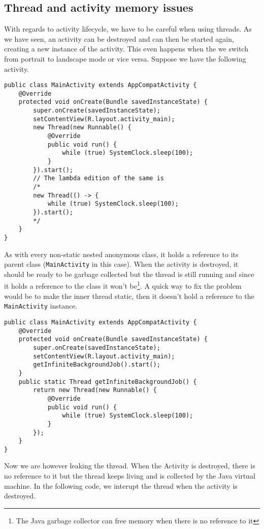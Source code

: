 \subsection{Thread and activity memory issues}
With regards to activity lifecycle, we have to be careful when using threads. As we have seen, an activity can be destroyed and can then be started again, creating a new instance of the activity. This even happens when the we switch from portrait to landscape mode or vice versa. Suppose we have the following activity.
\begin{lstlisting}[style=A_Java]
public class MainActivity extends AppCompatActivity {
    @Override
    protected void onCreate(Bundle savedInstanceState) {
        super.onCreate(savedInstanceState);
        setContentView(R.layout.activity_main);
        new Thread(new Runnable() {
            @Override
            public void run() {
                while (true) SystemClock.sleep(100);
            }
        }).start();
        // The lambda edition of the same is
        /*
        new Thread(() -> {
            while (true) SystemClock.sleep(100);
        }).start();
        */
    }
}
\end{lstlisting}
As with every non-static nested anonymous class, it holds a reference to its parent class (\texttt{MainActivity} in this case). When the activity is destroyed, it should be ready to be garbage collected but the thread is still running and since it holds a reference to the class it won't be\footnote{The Java garbage collector can free memory when there is no reference to it}. A quick way to fix the problem would be to make the inner thread static, then it doesn't hold a reference to the \texttt{MainActivity} instance.
\begin{lstlisting}[style=A_Java]
public class MainActivity extends AppCompatActivity {
    @Override
    protected void onCreate(Bundle savedInstanceState) {
        super.onCreate(savedInstanceState);
        setContentView(R.layout.activity_main);
        getInfiniteBackgroundJob().start();
    }
    public static Thread getInfiniteBackgroundJob() {
        return new Thread(new Runnable() {
            @Override
            public void run() {
                while (true) SystemClock.sleep(100);
            }
        });
    }
}
\end{lstlisting}
Now we are however leaking the thread. When the Activity is destroyed, there is no reference to it but the thread keeps living and is collected by the Java virtual machine. In the following code, we interupt the thread when the activity is destroyed.
